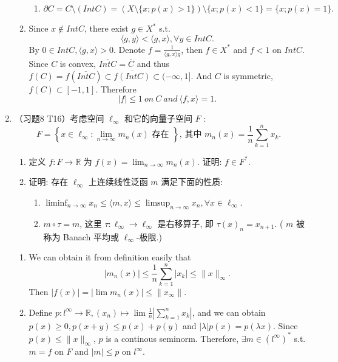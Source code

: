 \begin{enumerate}
\begin{answer}
\begin{enumerate}
\begin{enumerate}
            \item \[\partial C = C\setminus (Int C) = (X\setminus \{x; p(x)>1\})\setminus\{x; p(x) < 1\} = \{x; p(x) = 1\}. \]
        \end{enumerate}
        \item Since $x\notin Int C$, there exist $g\in X^*$ s.t.
        \[ \langle g, y\rangle < \langle g, x\rangle, \forall y \in Int C. \]
        By $0\in Int C, \langle g, x\rangle > 0$. Denote $f = \frac1{\langle g, x\rangle g}$, then $f\in X^*$ and $f < 1$ on $Int C$. Since $C$ is convex, $\overline{Int C} = \overline C$ and thus $f(C) = f(\overline{Int C})\subset \overline{f(Int C)}\subset(-\infty, 1]$. And $C$ is symmetric, $f(C)\subset [-1, 1]$. Therefore
        \[ |f| \leq 1\ on\ C\ and \ \langle f, x\rangle = 1. \]
    \end{enumerate}
    \end{answer}
  \item （习题8 T16）考虑空间 $\ell_{\infty}$ 和它的向量子空间 $F$ :
    $$
    F=\left\{x \in \ell_{\infty}: \lim _{n \rightarrow \infty} m_{n}(x) \text { 存在 }\right\} \text {, 其中 } m_{n}(x)=\frac{1}{n} \sum_{k=1}^{n} x_{k} \text {. }
    $$
    \begin{enumerate}
        \item 定义 $f: F \rightarrow \mathbb{R}$ 为 $f(x)=\lim _{n \rightarrow \infty} m_{n}(x)$. 证明: $f \in F^{*}$.
        \item 证明: 存在 $\ell_{\infty}$ 上连续线性泛函 $m$ 满足下面的性质:\begin{enumerate}
            \item $\liminf _{n \rightarrow \infty} x_{n} \leqslant \langle m, x\rangle  \leqslant \limsup _{n \rightarrow \infty} x_{n}, \forall x \in \ell_{\infty}$.
            \item $m \circ \tau=m$, 这里 $\tau: \ell_{\infty} \rightarrow \ell_{\infty}$ 是右移算子, 即 $\tau(x)_{n}=x_{n+1}$. ( $m$ 被称为 Banach 平均或 $\ell_{\infty}$-极限.)
        \end{enumerate}
    \end{enumerate}
    \begin{answer}
      \begin{enumerate}
        \item We can obtain it from definition easily that
        \[ |m_n(x)| \leq \frac1n\sum_{k=1}^n |x_k|\leq \|x\|_\infty. \]
        Then $|f(x)| = |\lim m_n(x)|\leq \|x_\infty\|.$
        \item Define $p: l^\infty\to \mathbb R, (x_n)\mapsto \lim \frac1n|\sum_{k = 1}^nx_k|$, and we can obtain $p(x) \geq 0, p(x + y)\leq p(x) + p(y)$ and $|\lambda|p(x) = p(\lambda x)$. Since $p(x) \leq \|x\|_\infty$, $p$ is a continous seminorm. Therefore, $\exists m\in (l^\infty)^*$ s.t. $m = f$ on $F$ and $|m|\leq p$ on $l^\infty$.


\end{enumerate}
\end{answer}
\end{enumerate}
